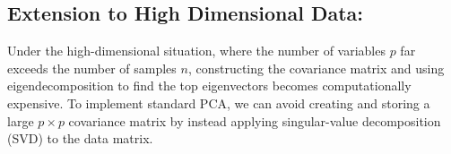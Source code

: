 \documentclass[10pt]{article}
\begin{document}



\subsection{Extension to High Dimensional Data:}

Under the high-dimensional situation, where the number of variables $p$ far exceeds the number of samples $n$, constructing the covariance matrix and using eigendecomposition to find the top eigenvectors becomes computationally expensive. To implement standard PCA, we can avoid creating and storing a large $p \times p$ covariance matrix by instead applying singular-value decomposition (SVD) to the data matrix.
\end{document}
